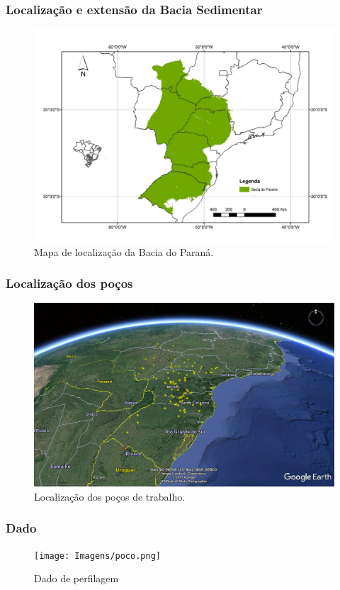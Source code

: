 \documentclass[aspectratio=10]{beamer} %
\begin{document}
\begin{frame}
\frametitle{Localização e extensão da Bacia Sedimentar}
\begin{figure}[H]
\centering
\includegraphics[scale=0.3]{Imagens/BaciaParana.jpg}
\caption{Mapa de localização da Bacia do Paraná. }
\label{mapa geologico}
\end{figure}
\end{frame}

\begin{frame}
\frametitle{Localização dos poços}
\begin{figure}[H]
\centering
\includegraphics[scale=0.25]{Imagens/Pocos2.png}
\caption{Localização dos poços de trabalho.}
\label{real}
\end{figure}
\end{frame}

\begin{frame}
\frametitle{Dado}
\begin{figure}[H]
\centering
\texttt{[image: Imagens/poco.png]}
\caption{Dado de perfilagem }
\end{figure}
\end{frame}
\end{document}
